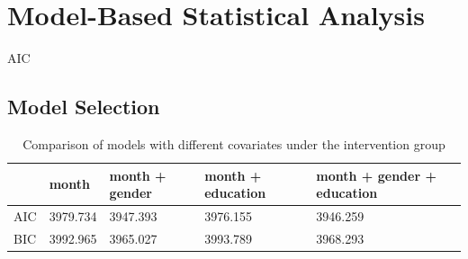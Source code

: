 \section{Model-Based Statistical Analysis}

AIC \cite{wu2009mixed}

\subsection{Model Selection}

\begin{table}[H]
\centering
\begin{tabular}{|l|l|l|l|l|}
\hline
& month & month + gender & month + education & month + gender + education \\
\hline
AIC & 3979.734 & 3947.393 & 3976.155 & 3946.259 \\
\hline
BIC & 3992.965 & 3965.027 & 3993.789 & 3968.293\\
\hline
\end{tabular}
\caption{Comparison of models with different covariates under the intervention group}
\label{tab:model.comp.intervention}
\end{table}

